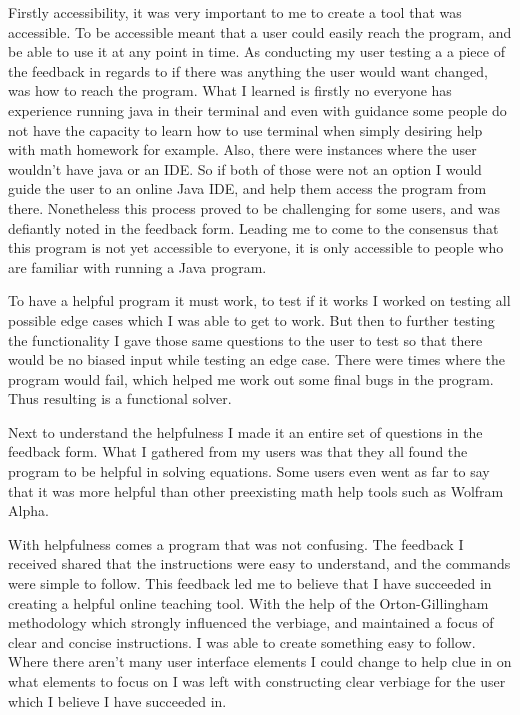 \documentclass[10pt,twocolumn]{article}
\begin{document}
Firstly accessibility, it was very important to me to create a tool that was accessible. To be accessible meant that a user could easily reach the program, and be able to use it at any point in time. As conducting my user testing a a piece of the feedback in regards to if there was anything the user would want changed, was how to reach the program. What I learned is firstly no everyone has experience running java in their terminal and even with guidance some people do not have the capacity to learn how to use terminal when simply desiring help with math homework for example. Also, there were instances where the user wouldn't have java or an IDE. So if both of those were not an option I would guide the user to an online Java IDE, and help them access the program from there. Nonetheless this process proved to be challenging for some users, and was defiantly noted in the feedback form. Leading me to come to the consensus that this program is not yet accessible to everyone, it is only accessible to people who are familiar with running a Java program.

To have a helpful program it must work, to test if it works I worked on testing all possible edge cases which I was able to get to work. But then to further testing the functionality I gave those same questions to the user to test so that there would be no biased input while testing an edge case. There were times where the program would fail, which helped me work out some final bugs in the program. Thus resulting is a functional solver.  

Next to understand the helpfulness I made it an entire set of questions in the feedback form. What I gathered from my users was that they all found the program to be helpful in solving equations. Some users even went as far to say that it was more helpful than other preexisting math help tools such as Wolfram Alpha. 

With helpfulness comes a program that was not confusing. The feedback I received shared that the instructions were easy to understand, and the commands were simple to follow. This feedback led me to believe that I have succeeded in creating a helpful online teaching tool. With the help of the Orton-Gillingham methodology which strongly influenced the verbiage, and maintained a focus of clear and concise instructions. I was able to create something easy to follow. Where there aren't many user interface elements I could change to help clue in on what elements to focus on I was left with constructing clear verbiage for the user which I believe I have succeeded in. 
\end{document}
